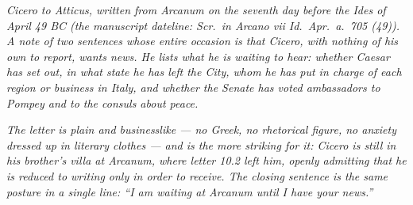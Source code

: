 
\textit{Cicero to Atticus, written from Arcanum on the
seventh day before the Ides of April 49 BC (the manuscript
dateline: \textit{Scr.\ in Arcano vii Id.\ Apr.\ a.\ 705
(49)}). A note of two sentences whose entire occasion is
that Cicero, with nothing of his own to report, wants news.
He lists what he is waiting to hear: whether Caesar has set
out, in what state he has left the City, whom he has put
in charge of each region or business in Italy, and whether
the Senate has voted ambassadors to Pompey and to the
consuls about peace.}

\textit{The letter is plain and businesslike --- no Greek,
no rhetorical figure, no anxiety dressed up in literary
clothes --- and is the more striking for it: Cicero is still
in his brother's villa at Arcanum, where letter 10.2 left
him, openly admitting that he is reduced to writing only in
order to receive. The closing sentence is the same posture
in a single line: ``I am waiting at Arcanum until I have
your news.''}

